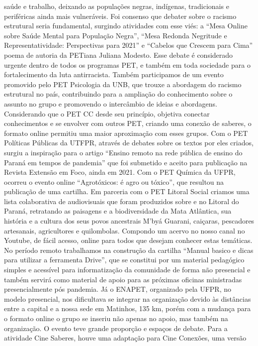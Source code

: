 saúde e trabalho, deixando as populações negras, indígenas, tradicionais e periféricas ainda mais
vulneráveis. Foi consenso que debater sobre o racismo estrutural seria fundamental, surgindo
atividades com esse viés: a “Mesa Online sobre Saúde Mental para População Negra”, “Mesa
Redonda Negritude e Representatividade: Perspectivas para 2021” e “Cabelos que Crescem para
Cima” poema de autoria da PETiana Juliana Modesto. Esse debate é considerado urgente dentro
de todos os programas PET, e também em toda sociedade para o fortalecimento da luta
antirracista. Também participamos de um evento promovido pelo PET Psicologia da UNB, que
trouxe a abordagem do racismo estrutural no país, contribuindo para a ampliação do
conhecimento sobre o assunto no grupo e promovendo o intercâmbio de ideias e abordagens.
Considerando que o PET CC desde seu princípio, objetiva conectar conhecimentos e se
envolver com outros PET, criando uma conexão de saberes, o formato online permitiu uma maior
aproximação com esses grupos. Com o PET Políticas Públicas da UTFPR, através de debates
sobre os textos por eles criados, surgiu a inspiração para o artigo “Ensino remoto na rede pública
de ensino do Paraná em tempos de pandemia” que foi submetido e aceito para publicação na
Revista Extensão em Foco, ainda em 2021. Com o PET Química da UFPR, ocorreu o evento
online “Agrotóxicos: é agro ou tóxico”, que resultou na publicação de uma cartilha. Em parceria
com o PET Litoral Social criamos uma lista colaborativa de audiovisuais que foram produzidos
sobre e no Litoral do Paraná, retratando as paisagens e a biodiversidade da Mata Atlântica, sua
história e a cultura dos seus povos ancestrais M’byá Guarani, caiçaras, pescadores artesanais,
agricultores e quilombolas. Compondo um acervo no nosso canal no Youtube, de fácil acesso,
online para todos que desejam conhecer estas temáticas.
No período remoto trabalhamos na construção da cartilha “Manual basico e dicas para
utilizar a ferramenta Drive”, que se constitui por um material pedagógico simples e acessível
para informatização da comunidade de forma não presencial e também servirá como material de
apoio para as próximas oficinas ministradas presencialmente pós pandemia. Já o ENAPET,
organizado pela UFPR, no modelo presencial, nos dificultava se integrar na organização devido
às distâncias entre a capital e a nossa sede em Matinhos, 135 km, porém com a mudança para o
formato online o grupo se inseriu não apenas no apoio, mas também na organização. O evento
teve grande proporção e espaços de debate.
Para a atividade Cine Saberes, houve uma adaptação para Cine Conexões, uma versão
